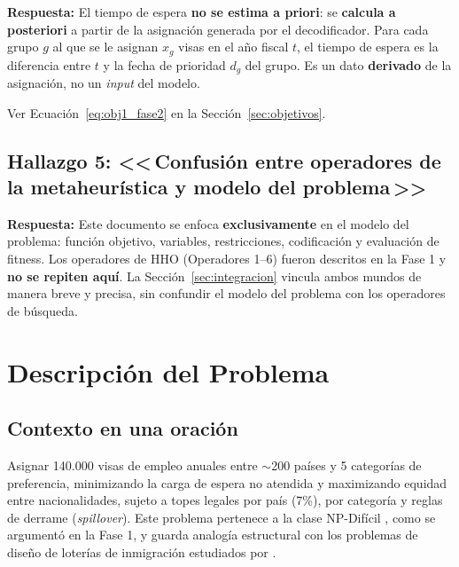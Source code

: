 \documentclass[12pt,letterpaper]{article}
\begin{document}
\begin{answerbox}
\textbf{Respuesta:} El tiempo de espera \textbf{no se estima a priori}: se \textbf{calcula a posteriori} a partir de la asignación generada por el decodificador. Para cada grupo $g$ al que se le asignan $x_g$ visas en el año fiscal $t$, el tiempo de espera es la diferencia entre $t$ y la fecha de prioridad $d_g$ del grupo. Es un dato \textbf{derivado} de la asignación, no un \textit{input} del modelo.

Ver Ecuación~\ref{eq:obj1_fase2} en la Sección~\ref{sec:objetivos}.
\end{answerbox}

\subsection{\texorpdfstring{Hallazgo 5: <<\,Confusión entre operadores de la metaheurística y modelo del problema\,>>}{Hallazgo 5: Confusión entre operadores de la metaheurística y modelo del problema}}

\begin{answerbox}
\textbf{Respuesta:} Este documento se enfoca \textbf{exclusivamente} en el modelo del problema: función objetivo, variables, restricciones, codificación y evaluación de fitness. Los operadores de HHO (Operadores 1--6) fueron descritos en la Fase 1 y \textbf{no se repiten aquí}. La Sección~\ref{sec:integracion} vincula ambos mundos de manera breve y precisa, sin confundir el modelo del problema con los operadores de búsqueda.
\end{answerbox}

\newpage
\section{Descripción del Problema}

\subsection{Contexto en una oración}

Asignar 140.000 visas de empleo anuales entre $\sim$200 países y 5 categorías de preferencia, minimizando la carga de espera no atendida y maximizando equidad entre nacionalidades, sujeto a topes legales por país (7\%), por categoría y reglas de derrame (\textit{spillover}). Este problema pertenece a la clase NP-Difícil \parencite{gareyjohnson1979}, como se argumentó en la Fase 1, y guarda analogía estructural con los problemas de diseño de loterías de inmigración estudiados por \textcite{pathak2025}.
\end{document}
